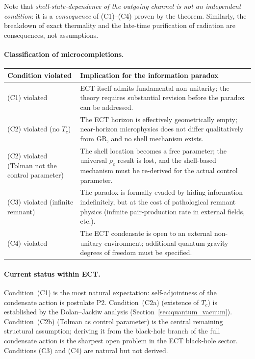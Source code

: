 \documentclass[11pt,a4paper]{article}
\numberwithin{equation}{section}
\begin{document}
Note that \emph{shell-state-dependence of the outgoing channel is not
an independent condition}: it is a \emph{consequence} of (C1)--(C4)
proven by the theorem.
Similarly, the breakdown of exact thermality and the late-time purification
of radiation are consequences, not assumptions.

\paragraph{Classification of microcompletions.}

\begin{center}
\begin{tabular}{@{}p{}p{}@{}}
\toprule
Condition violated & Implication for the information paradox \\
\midrule
(C1) violated & ECT itself admits fundamental non-unitarity; the theory
requires substantial revision before the paradox can be addressed. \\[4pt]
(C2) violated (no $T_c$) & The ECT horizon is effectively geometrically
empty; near-horizon microphysics does not differ qualitatively from GR,
and no shell mechanism exists. \\[4pt]
(C2) violated (Tolman not the control parameter) & The shell location becomes
a free parameter; the universal $\rho_c$ result is lost, and the shell-based
mechanism must be re-derived for the actual control parameter. \\[4pt]
(C3) violated (infinite remnant) & The paradox is formally evaded by hiding
information indefinitely, but at the cost of pathological remnant physics
(infinite pair-production rate in external fields, etc.). \\[4pt]
(C4) violated & The ECT condensate is open to an external non-unitary
environment; additional quantum gravity degrees of freedom must be specified. \\
\bottomrule
\end{tabular}
\end{center}

\paragraph{Current status within ECT.}

Condition~(C1) is the most natural expectation: self-adjointness of the
condensate action is postulate P2.
Condition~(C2a) (existence of $T_c$) is established by the Dolan--Jackiw
analysis (Section~\ref{sec:quantum_vacuum}).
Condition~(C2b) (Tolman as control parameter) is the central remaining
structural assumption; deriving it from the black-hole branch of the full
condensate action is the sharpest open problem in the ECT black-hole sector.
Conditions (C3) and (C4) are natural but not derived.
\end{document}

